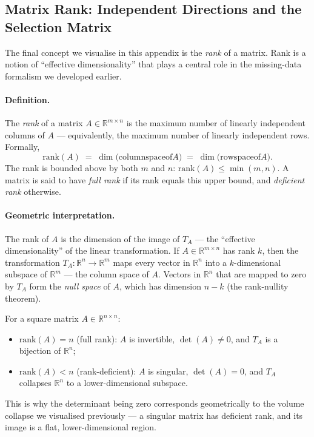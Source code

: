\documentclass[11pt, a4paper, oneside]{article}
\begin{document}
\newpage

\subsection{Matrix Rank: Independent Directions and the Selection Matrix}
\label{sec:appendix-rank}

The final concept we visualise in this appendix is the \emph{rank} of
a matrix. Rank is a notion of ``effective dimensionality'' that
plays a central role in the missing-data formalism we developed
earlier.

\paragraph{Definition.}
The \emph{rank} of a matrix $A \in \mathbb{R}^{m \times n}$ is the
maximum number of linearly independent columns of $A$ — equivalently,
the maximum number of linearly independent rows. Formally,
\[
\mathrm{rank}(A) \;=\; \dim\big(\mathrm{column space of } A\big) \;=\; \dim\big(\mathrm{row space of } A\big).
\]
The rank is bounded above by both $m$ and $n$:
$\mathrm{rank}(A) \leq \min(m, n)$. A matrix is said to have
\emph{full rank} if its rank equals this upper bound, and
\emph{deficient rank} otherwise.

\paragraph{Geometric interpretation.}
The rank of $A$ is the dimension of the image of $T_A$ — the
``effective dimensionality'' of the linear transformation. If
$A \in \mathbb{R}^{m \times n}$ has rank $k$, then the transformation
$T_A: \mathbb{R}^n \to \mathbb{R}^m$ maps every vector in
$\mathbb{R}^n$ into a $k$-dimensional subspace of $\mathbb{R}^m$ —
the column space of $A$. Vectors in $\mathbb{R}^n$ that are mapped
to zero by $T_A$ form the \emph{null space} of $A$, which has
dimension $n - k$ (the rank-nullity theorem).

For a square matrix $A \in \mathbb{R}^{n \times n}$:
\begin{itemize}[leftmargin=1.5em, itemsep=2pt]
    \item $\mathrm{rank}(A) = n$ (full rank): $A$ is invertible,
          $\det(A) \neq 0$, and $T_A$ is a bijection of
          $\mathbb{R}^n$;
    \item $\mathrm{rank}(A) < n$ (rank-deficient): $A$ is singular,
          $\det(A) = 0$, and $T_A$ collapses $\mathbb{R}^n$ to a
          lower-dimensional subspace.
\end{itemize}
This is why the determinant being zero corresponds geometrically to
the volume collapse we visualised previously — a singular matrix has
deficient rank, and its image is a flat, lower-dimensional region.
\end{document}

